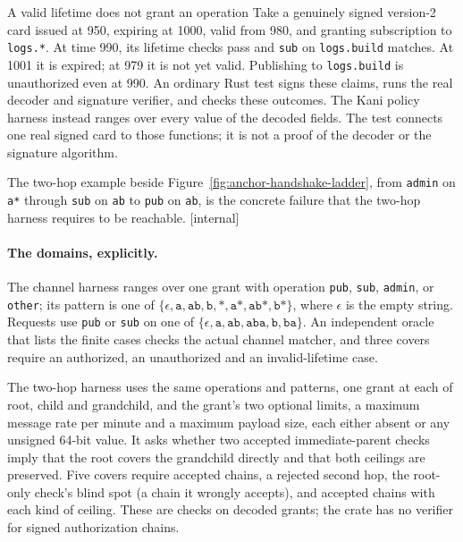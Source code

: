 \documentclass[11pt,a4paper]{article}
\theoremstyle{definition}
\begin{document}
\begin{pdexample}{A valid lifetime does not grant an operation}
\setlength{\parskip}{4pt plus 1pt}
Take a genuinely signed version-2 card issued at 950, expiring at 1000,
valid from 980, and granting subscription to \texttt{logs.*}. At time 990,
its lifetime checks pass and \texttt{sub} on \texttt{logs.build} matches.
At 1001 it is expired; at 979 it is not yet valid. Publishing to
\texttt{logs.build} is unauthorized even at 990. An ordinary Rust test
signs these claims, runs the real decoder and signature verifier, and checks
these outcomes. The Kani policy harness instead ranges over every value of
the decoded fields. The test connects one real signed card to those
functions; it is not a proof of the decoder or the signature algorithm.

The two-hop example beside Figure~\ref{fig:anchor-handshake-ladder}, from
\texttt{admin} on \texttt{a*} through \texttt{sub} on \texttt{ab} to
\texttt{pub} on \texttt{ab}, is the concrete failure that the two-hop harness
requires to be reachable. [internal]
\end{pdexample}

\paragraph{The domains, explicitly.}
The channel harness ranges over one grant with operation
\texttt{pub}, \texttt{sub}, \texttt{admin}, or \texttt{other}; its pattern is
one of $\{\epsilon,\texttt{a},\texttt{ab},\texttt{b},\texttt{*},
\texttt{a*},\texttt{ab*},\texttt{b*}\}$, where $\epsilon$ is the empty string.
Requests use \texttt{pub} or \texttt{sub} on one of
$\{\epsilon,\texttt{a},\texttt{ab},\texttt{aba},\texttt{b},\texttt{ba}\}$.
An independent oracle that lists the finite cases checks the actual channel
matcher, and three covers require an authorized, an unauthorized and an
invalid-lifetime case.

The two-hop harness uses the same operations and patterns, one grant
at each of root, child and grandchild, and the grant's two optional limits, a
maximum message rate per minute and a maximum payload size, each either absent
or any unsigned 64-bit value. It asks whether two accepted
immediate-parent checks imply that the root covers the grandchild directly and
that both ceilings are preserved. Five covers require accepted chains, a
rejected second hop, the root-only check's blind spot (a chain it wrongly accepts), and accepted
chains with each kind of ceiling. These are checks on decoded grants; the
crate has no verifier for signed authorization chains.
\end{document}
